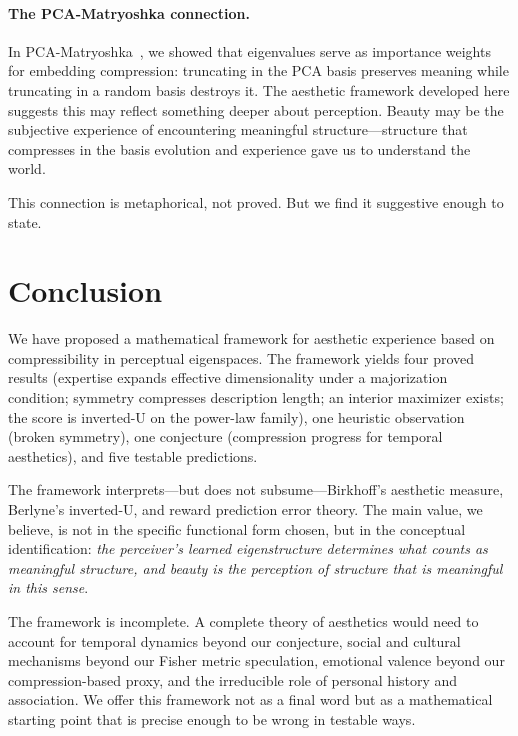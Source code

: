 \documentclass[journal]{IEEEtran}
\theoremstyle{definition}
\theoremstyle{remark}
\begin{document}
\paragraph{The PCA-Matryoshka connection.}
In PCA-Matryoshka~\cite{bond2026pcamatryoshka}, we showed that
eigenvalues serve as importance weights for embedding
compression: truncating in the PCA basis preserves meaning while
truncating in a random basis destroys it.  The aesthetic framework
developed here suggests this may reflect something deeper about
perception.  Beauty may be the subjective experience of encountering
meaningful structure---structure that compresses in the basis
evolution and experience gave us to understand the world.

This connection is metaphorical, not proved.  But we find it
suggestive enough to state.


\section{Conclusion}
\label{sec:conclusion}

We have proposed a mathematical framework for aesthetic experience
based on compressibility in perceptual eigenspaces.  The framework
yields four proved results (expertise expands effective
dimensionality under a majorization condition; symmetry compresses
description length; an interior maximizer exists; the score is
inverted-U on the power-law family), one heuristic observation
(broken symmetry), one conjecture (compression progress for temporal
aesthetics), and five testable predictions.

The framework interprets---but does not subsume---Birkhoff's
aesthetic measure, Berlyne's inverted-U, and reward prediction
error theory.  The main value, we believe, is not in the specific
functional form chosen, but in the conceptual identification:
\emph{the perceiver's learned eigenstructure determines what counts
as meaningful structure, and beauty is the perception of structure
that is meaningful in this sense}.

The framework is incomplete.  A complete theory of aesthetics
would need to account for temporal dynamics beyond our conjecture,
social and cultural mechanisms beyond our Fisher metric speculation,
emotional valence beyond our compression-based proxy, and the
irreducible role of personal history and association.  We offer this
framework not as a final word but as a mathematical starting point
that is precise enough to be wrong in testable ways.
\end{document}
